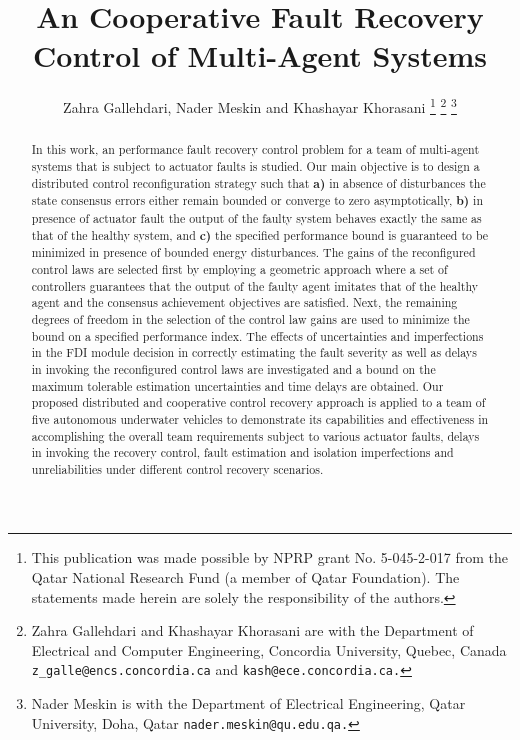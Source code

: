 \documentclass[12pt,draftcls,onecolumn]{IEEEtran}
\author{Zahra Gallehdari, Nader Meskin and Khashayar Khorasani
\thanks{This publication was made possible by NPRP grant No.  5-045-2-017
from the Qatar National Research Fund (a member of Qatar Foundation).
The statements made herein are solely the responsibility of the authors.}
\thanks{Zahra Gallehdari and Khashayar Khorasani are with the Department
of Electrical and Computer Engineering, Concordia University,
Quebec, Canada
         {\tt\small z\_galle@encs.concordia.ca} and  {\tt\small kash@ece.concordia.ca.}}
\thanks{Nader Meskin is with the Department of Electrical Engineering, Qatar
University, Doha, Qatar
        {\tt\small nader.meskin@qu.edu.qa.}}
}
\date{}
\begin{document}
\title {\LARGE \bf 
An  Cooperative Fault Recovery Control   of Multi-Agent Systems}
\maketitle

\nocite{Basil:2010:MISC}

\newtheorem {lemmas}{\textbf{Lemma}} 
\newtheorem {theorems}{\textbf{Theorem}} 
\newtheorem {definitions}{\textbf{Definition}} 
\newtheorem {assumptions}{\textbf{Assumption}} 
\newtheorem {corollaries}{\textbf{Corollary}} 
\newtheorem{remarks}{\textbf{Remark}} 
\newtheorem{notations}{\textbf{Notation}} 
\newtheorem{Propositions}{\textbf{Proposition}} 
\newtheorem{facts}{\textbf{Fact}}
\newtheorem{algorithm}{\textbf{Algorithm}}


\begin{abstract}
In this work, an  performance fault recovery control problem for a team of multi-agent systems that is subject to actuator faults is studied. Our main objective is to design a distributed control reconfiguration strategy such that \textbf{a)} in absence of disturbances the  state consensus errors either remain bounded or converge to zero asymptotically, \textbf{b)} in presence of actuator fault the output of the faulty system behaves exactly  the same as that of the healthy system, and \textbf{c)}  the specified   performance bound is guaranteed to be minimized in presence of bounded energy disturbances. 
The gains of the reconfigured  control laws are selected first by employing a geometric approach  where a set of controllers guarantees that the output of the faulty agent imitates that of the healthy agent and the consensus achievement objectives are satisfied. Next, the remaining degrees of freedom in the selection of the control law gains are used to minimize the bound on a specified  performance index. 
The effects of  uncertainties and imperfections in the FDI module decision in correctly estimating the fault severity as well as delays in invoking the reconfigured control laws are investigated and a bound on the maximum tolerable estimation uncertainties and time delays are obtained.
Our proposed distributed and cooperative control recovery approach is applied to a team of five autonomous underwater vehicles  to demonstrate its capabilities and effectiveness in accomplishing the overall team requirements subject to various actuator faults, delays in invoking the recovery control, fault estimation and isolation imperfections and unreliabilities under different  control recovery scenarios. 
\end{abstract}
\end{document}
